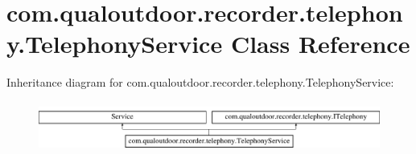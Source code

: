 \hypertarget{classcom_1_1qualoutdoor_1_1recorder_1_1telephony_1_1TelephonyService}{\section{com.\-qualoutdoor.\-recorder.\-telephony.\-Telephony\-Service Class Reference}
\label{classcom_1_1qualoutdoor_1_1recorder_1_1telephony_1_1TelephonyService}
}
Inheritance diagram for com.\-qualoutdoor.\-recorder.\-telephony.\-Telephony\-Service\-:\begin{figure}[H]
\begin{center}
\leavevmode
\includegraphics[height=1.681682cm]{classcom_1_1qualoutdoor_1_1recorder_1_1telephony_1_1TelephonyService}
\end{center}
\end{figure}

